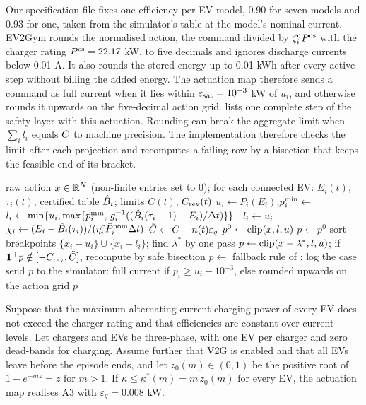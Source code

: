 Our specification file fixes one efficiency per EV model, 0.90 for seven models and 0.93 for one, taken from the simulator's table at the model's nominal current.
EV2Gym rounds the normalised action, the command divided by $\zeta_i^{\mathrm c}P^{\mathrm{cs}}$ with the charger rating $P^{\mathrm{cs}}=22.17$ kW, to five decimals and ignores discharge currents below 0.01 A.
It also rounds the stored energy up to 0.01 kWh after every active step without billing the added energy.
The actuation map therefore sends a command as full current when it lies within $\varepsilon_{\mathrm{sat}}=10^{-3}$ kW of $u_i$, and otherwise rounds it upwards on the five-decimal action grid.
 lists one complete step of the safety layer with this actuation.
Rounding can break the aggregate limit when $\sum_il_i$ equals $\tilde C$ to machine precision.
The implementation therefore checks the limit after each projection and recomputes a failing row by a bisection that keeps the feasible end of its bracket.

\begin{algorithm}[t]
\caption{One step of the safety layer}\label{alg:safety}
\begin{algorithmic}[1]
\Require raw action $x\in\mathbb R^N$ (non-finite entries set to 0); for each connected EV: $E_i(t)$, $\tau_i(t)$, certified table $\hat B_i$; limits $C(t)$, $C_{\mathrm{rev}}(t)$
  \State $u_i\gets\bar P_i(E_i)$;\quad $p^{\min}_i\gets$ 
   $l_i\gets\min\{u_i,\max\{p^{\min}_i,\,g_i^{-1}((\hat B_i(\tau_i-1)-E_i)/\Delta t)\}\}$ \Else\ $l_i\gets u_i$ \EndIf
  \State $\chi_i\gets(E_i-\hat B_i(\tau_i))/(\eta_i^{\mathrm c}\bar P^{\mathrm{nom}}_i\Delta t)$
\EndFor
\State $\tilde C\gets C-n(t)\varepsilon_q$
 
  \State $p^{0}\gets\operatorname{clip}(x,l,u)$
   $p\gets p^{0}$
  \Else
    \State sort breakpoints $\{x_i-u_i\}\cup\{x_i-l_i\}$; find $\lambda^{*}$ by one pass
    \State $p\gets\operatorname{clip}(x-\lambda^{*},l,u)$; if $\mathbf 1^\top p\notin[-C_{\mathrm{rev}},\tilde C]$, recompute by safe bisection
  \EndIf
\Else
  \State $p\gets$ fallback rule of ; log the case
\EndIf
\State send $p$ to the simulator: full current if $p_i\ge u_i-10^{-3}$, else rounded upwards on the action grid
\State \Return $p$
\end{algorithmic}
\end{algorithm}

\begin{lemma}[A3 in EV2Gym]\label{lem:a3}
Suppose that the maximum alternating-current charging power of every EV does not exceed the charger rating and that efficiencies are constant over current levels.
Let chargers and EVs be three-phase, with one EV per charger and zero dead-bands for charging.
Assume further that V2G is enabled and that all EVs leave before the episode ends, and let $z_0(m)\in(0,1)$ be the positive root of $1-e^{-mz}=z$ for $m>1$.
If $\kappa\le\kappa^{*}(m)=m\,z_0(m)$ for every EV, the actuation map realises A3 with $\varepsilon_q=0.008$ kW.
\end{lemma}

